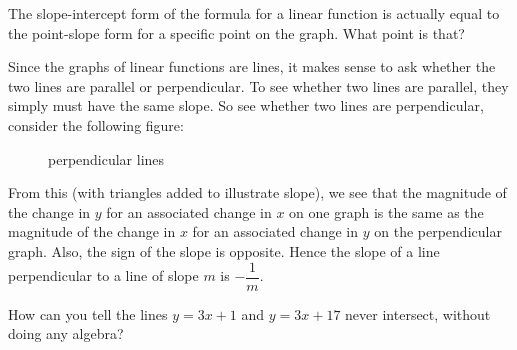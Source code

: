 \par

\begin{question} The slope-intercept form of the formula for a linear function is actually equal to the point-slope form for a specific point on the graph. What point is that? 
\end{question}

\par

Since the graphs of linear functions are lines, it makes sense to ask whether the two lines are parallel or perpendicular. To see whether two lines are parallel, they simply must have the same slope. So see whether two lines are perpendicular, consider the following figure:

\begin{figure}[h]
\centering
{} 
\caption{perpendicular lines}
\end{figure} 

From this (with triangles added to illustrate slope), we see that the magnitude of the change in $y$ for an associated change in $x$ on one graph is the same as the magnitude of the change in $x$ for an associated change in $y$ on the perpendicular graph. Also, the sign of the slope is opposite. Hence the slope of a line perpendicular to a line of slope $m$ is $-\dfrac{1}{m}$.


\begin{question} How can you tell the lines $y = 3x+1$ and $y=3x+17$ never intersect, without doing any algebra? 
\end{question}

